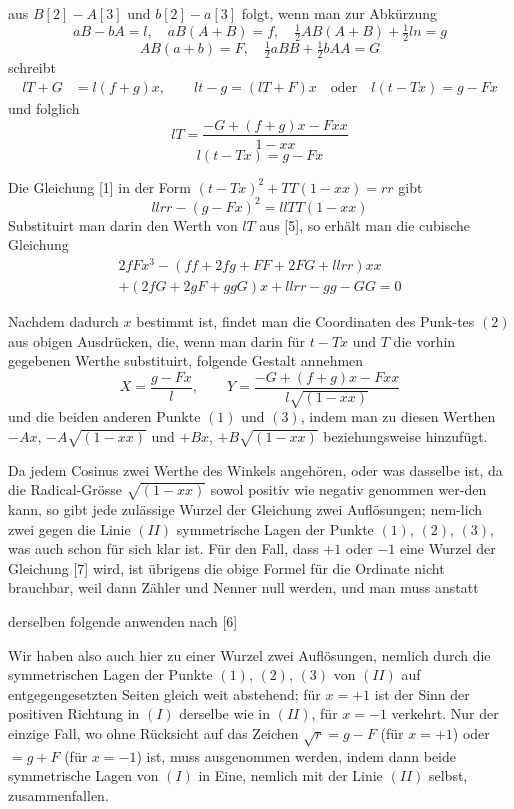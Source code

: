 \documentclass[12pt,a4paper]{article}
\begin{document}
\newpage
aus $B[2] - A[3]$ und $b[2] - a[3]$ folgt, wenn man zur Abk\"urzung
\[
aB - bA = l,\quad aB(A+B) = f,\quad \tfrac{1}{2}AB(A+B) + \tfrac{1}{2}ln = g
\]
\[
AB(a+b) = F,\quad \tfrac{1}{2}aBB + \tfrac{1}{2}bAA = G
\]
schreibt
\begin{align*}
lT + G &= l(f+g)x,\qquad lt - g = (lT+F)x\quad \text{oder}\quad l(t-Tx) = g - Fx
\end{align*}
und folglich
\[
lT = \frac{-G+(f+g)x-Fxx}{1-xx}
\]
\[
l(t-Tx) = g - Fx
\]

Die Gleichung [1] in der Form $(t-Tx)^2 + TT(1-xx) = rr$ gibt
\[
llrr - (g-Fx)^2 = llTT(1-xx) \tag{[6]}
\]
Substituirt man darin den Werth von $lT$ aus [5], so erh\"alt man die cubische
Gleichung
\begin{multline*}
2fFx^3 - (ff + 2fg + FF + 2FG + llrr)xx \\
+ (2fG + 2gF + ggG)x + llrr - gg - GG = 0 \tag{[7]}
\end{multline*}

Nachdem dadurch $x$ bestimmt ist, findet man die Coordinaten des Punk-\/tes $(2)$ aus obigen Ausdr\"ucken, die, wenn man darin f\"ur $t-Tx$ und $T$ die
vorhin gegebenen Werthe substituirt, folgende Gestalt annehmen
\[
X = \frac{g-Fx}{l},\qquad Y = \frac{-G+(f+g)x-Fxx}{l\sqrt{(1-xx)}}
\]
und die beiden anderen Punkte $(1)$ und $(3)$, indem man zu diesen Werthen
$-Ax$, $-A\sqrt{(1-xx)}$ und $+Bx$, $+B\sqrt{(1-xx)}$ beziehungsweise hinzuf\"ugt.

Da jedem Cosinus zwei Werthe des Winkels angeh\"oren, oder was dasselbe
ist, da die Radical-Gr\"osse $\sqrt{(1-xx)}$ sowol positiv wie negativ genommen wer-\/den kann, so gibt jede zul\"assige Wurzel der Gleichung zwei Aufl\"osungen; nem-\/lich zwei gegen die Linie $(II)$ symmetrische Lagen der Punkte $(1)$, $(2)$, $(3)$, was
auch schon f\"ur sich klar ist. F\"ur den Fall, dass $+1$ oder $-1$ eine Wurzel
der Gleichung [7] wird, ist \"ubrigens die obige Formel f\"ur die Ordinate nicht
brauchbar, weil dann Z\"ahler und Nenner null werden, und man muss anstatt

\newpage
derselben folgende anwenden nach [6]

Wir haben also auch hier zu einer Wurzel zwei Aufl\"osungen, nemlich durch
die symmetrischen Lagen der Punkte $(1)$, $(2)$, $(3)$ von $(II)$ auf entgegengesetzten
Seiten gleich weit abstehend; f\"ur $x = +1$ ist der Sinn der positiven Richtung
in $(I)$ derselbe wie in $(II)$, f\"ur $x = -1$ verkehrt. Nur der einzige Fall, wo
ohne R\"ucksicht auf das Zeichen $\sqrt{r} = g-F$ (f\"ur $x = +1$) oder $= g+F$
(f\"ur $x = -1$) ist, muss ausgenommen werden, indem dann beide symmetrische
Lagen von $(I)$ in Eine, nemlich mit der Linie $(II)$ selbst, zusammenfallen.
\end{document}

